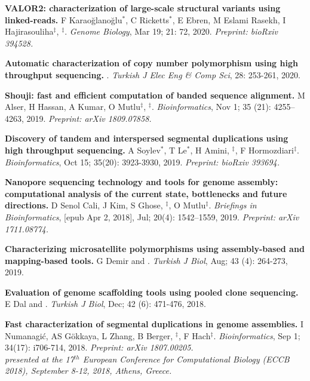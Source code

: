 \vspace{-.2cm}
 {\bf VALOR2: characterization of large-scale structural variants using linked-reads.}
 F Karaoğlanoğlu$^*$, C Ricketts$^*$, E Ebren, M Eslami Rasekh,  I Hajirasouliha$^\ddag$, \calkan{}$^\ddag$.
{\it Genome Biology}, Mar 19; 21: 72, 2020.  \textit{Preprint: bioRxiv 394528.}


   \vspace{-.2cm}
         {\bf Automatic characterization of copy number polymorphism using high throughput sequencing.}  \calkan{}. {\em Turkish J Elec Eng \& Comp Sci}, 28: 253-261, 2020.
         
\vspace{-.2cm}
{\bf Shouji: fast and efficient computation of banded sequence alignment.} M Alser, H Hassan, A Kumar, O Mutlu$^\ddag$, \calkan{}$^\ddag$.
{\em Bioinformatics}, Nov 1; 35 (21): 4255–4263, 2019. \textit{Preprint: arXiv 1809.07858.}


\vspace{-.2cm}
 {\bf Discovery of tandem and interspersed segmental duplications using high throughput sequencing.}
 A Soylev$^*$, T Le$^*$, H Amini, \calkan{}$^\ddag$, F Hormozdiari$^\ddag$.
{\em Bioinformatics}, Oct 15; 35(20): 3923-3930, 2019. \textit{Preprint: bioRxiv 393694.}


         
\vspace{-.2cm}

         {\bf Nanopore sequencing technology and tools for genome assembly: computational analysis of the current state, bottlenecks and future directions.}
         D Senol Cali, J Kim, S Ghose, \calkan{}$^\ddag$, O Mutlu$^\ddag$.
         {\em Briefings in Bioinformatics}, [epub Apr 2, 2018], Jul; 20(4): 1542–1559, 2019. \textit{Preprint: arXiv 1711.08774.}

\vspace{-.2cm}
         {\bf Characterizing microsatellite polymorphisms using assembly-based and mapping-based tools.}  G Demir and \calkan{}. {\em Turkish J Biol}, Aug; 43 (4): 264-273, 2019.


         \vspace{-.2cm}
         {\bf Evaluation of genome scaffolding tools using pooled clone sequencing.}  E Dal and \calkan{}. {\em Turkish J Biol}, Dec; 42 (6): 471-476, 2018.
         
         \vspace{-.2cm}

\clearpage
         {\bf Fast characterization of segmental duplications in genome assemblies.}
         I Numanagić,  AS Gökkaya, L Zhang, B Berger, \calkan{}$^\ddag$, F Hach$^\ddag$.
         {\em Bioinformatics}, Sep 1; 34(17): i706-714, 2018. \textit{Preprint: arXiv 1807.00205.}\\
         \hspace*{1cm}
          {\footnotesize \em presented at the 17$^{th}$ European Conference for Computational Biology (ECCB 2018), September 8-12, 2018, Athens, Greece.}

